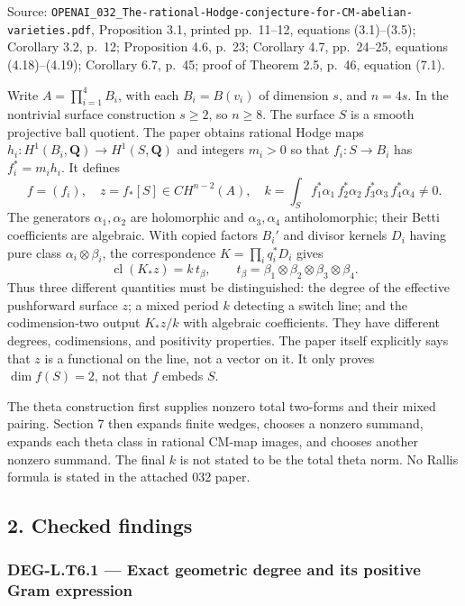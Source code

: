 \documentclass[11pt,a4paper]{article}
\theoremstyle{definition}
\begin{document}
Source: \texttt{OPENAI\_032\_The-rational-Hodge-conjecture-for-CM-abelian-varieties.pdf}, Proposition 3.1, printed pp.~11--12, equations (3.1)--(3.5); Corollary 3.2, p.~12; Proposition 4.6, p.~23; Corollary 4.7, pp.~24--25, equations (4.18)--(4.19); Corollary 6.7, p.~45; proof of Theorem 2.5, p.~46, equation (7.1).

Write \(A=\prod_{i=1}^4B_i\), with each \(B_i=B(v_i)\) of dimension \(s\), and \(n=4s\). In the nontrivial surface construction \(s\ge2\), so \(n\ge8\). The surface \(S\) is a smooth projective ball quotient. The paper obtains rational Hodge maps \(h_i:H^1(B_i,\mathbf Q)\to H^1(S,\mathbf Q)\) and integers \(m_i>0\) so that \(f_i:S\to B_i\) has \(f_i^*=m_i h_i\). It defines \[
f=(f_i),\quad z=f_*[S]\in CH^{n-2}(A),\quad
k=\int_S f_1^*\alpha_1\,f_2^*\alpha_2\,f_3^*\alpha_3\,f_4^*\alpha_4\ne0.
\] The generators \(\alpha_1,\alpha_2\) are holomorphic and \(\alpha_3,\alpha_4\) antiholomorphic; their Betti coefficients are algebraic. With copied factors \(B_i'\) and divisor kernels \(D_i\) having pure class \(\alpha_i\otimes\beta_i\), the correspondence \(K=\prod_i q_i^*D_i\) gives \[
\operatorname{cl}(K_*z)=k\,t_\beta,
\qquad t_\beta=\beta_1\otimes\beta_2\otimes\beta_3\otimes\beta_4.
\] Thus three different quantities must be distinguished: the degree of the effective pushforward surface \(z\); a mixed period \(k\) detecting a switch line; and the codimension-two output \(K_*z/k\) with algebraic coefficients. They have different degrees, codimensions, and positivity properties. The paper itself explicitly says that \(z\) is a functional on the line, not a vector on it. It only proves \(\dim f(S)=2\), not that \(f\) embeds \(S\).

The theta construction first supplies nonzero total two-forms and their mixed pairing. Section 7 then expands finite wedges, chooses a nonzero summand, expands each theta class in rational CM-map images, and chooses another nonzero summand. The final \(k\) is not stated to be the total theta norm. No Rallis formula is stated in the attached 032 paper.

\subsection{2. Checked findings}\label{checked-findings}

\subsubsection{DEG-L.T6.1 --- Exact geometric degree and its positive Gram expression}\label{DEG-L.T6.1}
\end{document}
